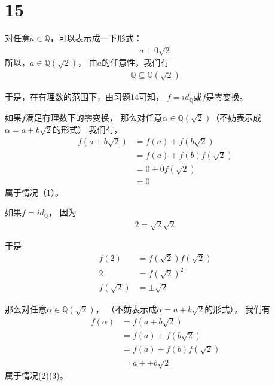 \documentclass{article}
\begin{document}
\section*{15}

对任意$a \in \mathbb{Q}$，可以表示成一下形式：
\begin{align*}
      a + 0\sqrt{2}
\end{align*}
所以，$a \in \mathbb{Q}(\sqrt{2})$，
由$a$的任意性，我们有
\begin{align*}
      \mathbb{Q} \subseteq \mathbb{Q}(\sqrt{2})
\end{align*}

于是，在有理数的范围下，由习题14可知，
$f = id_{\mathbb{Q}}$或$f$是零变换。

如果$f$满足有理数下的零变换，
那么对任意$\alpha \in \mathbb{Q}(\sqrt{2})$（不妨表示成$\alpha = a + b\sqrt{2}$的形式）
我们有，
\begin{align*}
      f(a + b\sqrt{2})
       & = f(a) + f(b\sqrt{2})    \\
       & = f(a) + f(b)f(\sqrt{2}) \\
       & = 0 + 0f(\sqrt{2})       \\
       & = 0
\end{align*}
属于情况（1）。

如果$f = id_{\mathbb{Q}}$，
因为
\begin{align*}
      2 = \sqrt{2} \sqrt{2}
\end{align*}

于是
\begin{align*}
      f(2)        & = f(\sqrt{2}) f(\sqrt{2}) \\
      2           & = f(\sqrt{2})^2           \\
      f(\sqrt{2}) & = \pm \sqrt{2}
\end{align*}

那么对任意$\alpha \in \mathbb{Q}(\sqrt{2})$，
（不妨表示成$\alpha = a + b\sqrt{2}$的形式），
我们有
\begin{align*}
      f(\alpha) & = f(a + b\sqrt{2})        \\
                & = f(a) + f(b\sqrt{2})     \\
                & = f(a) + f(b) f(\sqrt{2}) \\
                & = a + \pm b \sqrt{2}
\end{align*}
属于情况(2)(3)。
\end{document}
